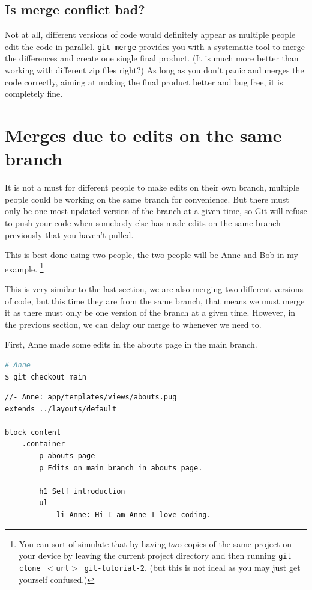 \subsection*{Is merge conflict bad?}

Not at all, different versions of code would definitely appear as multiple people edit the code in parallel. \texttt{git merge} provides you with a systematic tool to merge the differences and create one single final product. (It is much more better than working with different zip files right?) As long as you don't panic and merges the code correctly, aiming at making the final product better and bug free, it is completely fine. 

\section{Merges due to edits on the same branch}
\label{sec:mergesamebranch}

It is not a must for different people to make edits on their own branch, multiple people could be working on the same branch for convenience. But there must only be one most updated version of the branch at a given time, so Git will refuse to push your code when somebody else has made edits on the same branch previously that you haven't pulled. 

This is best done using two people, the two people will be Anne and Bob in my example. \footnote{You can sort of simulate that by having two copies of the same project on your device by leaving the current project directory and then running \texttt{git clone $<$url$>$ git-tutorial-2}. (but this is not ideal as you may just get yourself confused.)}

This is very similar to the last section, we are also merging two different versions of code, but this time they are from the same branch, that means we must merge it as there must only be one version of the branch at a given time. However, in the previous section, we can delay our merge to whenever we need to.

First, Anne made some edits in the abouts page in the main branch. 
\vspace{6mm}

\begin{lstlisting}[language=bash]
# Anne
$ git checkout main
\end{lstlisting}

\begin{lstlisting}[language=pug]
//- Anne: app/templates/views/abouts.pug
extends ../layouts/default

block content
	.container
		p abouts page
		p Edits on main branch in abouts page.

		h1 Self introduction
		ul
			li Anne: Hi I am Anne I love coding.
\end{lstlisting}

